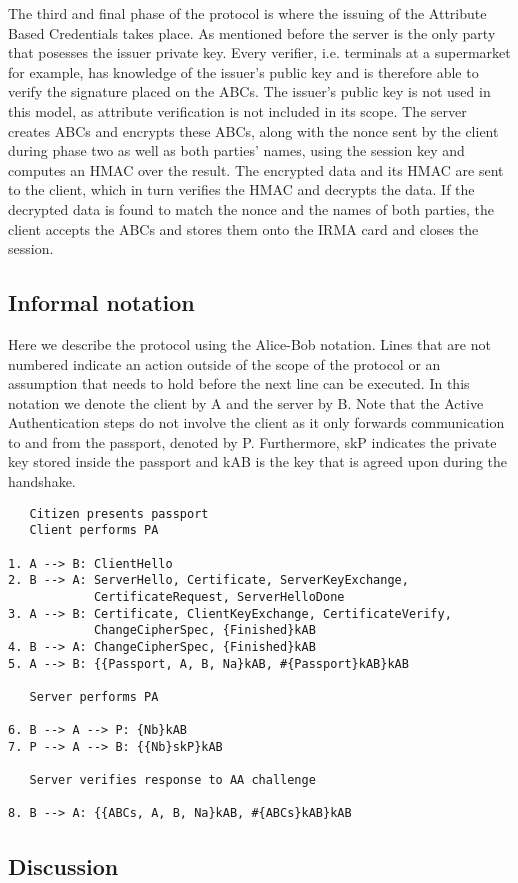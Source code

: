 The third and final phase of the protocol is where the issuing of the Attribute Based Credentials takes place. As mentioned before the server is the only party that posesses the issuer private key. Every verifier, i.e. terminals at a supermarket for example, has knowledge of the issuer's public key and is therefore able to verify the signature placed on the ABCs. The issuer's public key is not used in this model, as attribute verification is not included in its scope. The server creates ABCs and encrypts these ABCs, along with the nonce sent by the client during phase two as well as both parties' names, using the session key and computes an HMAC over the result. The encrypted data and its HMAC are sent to the client, which in turn verifies the HMAC and decrypts the data. If the decrypted data is found to match the nonce and the names of both parties, the client accepts the ABCs and stores them onto the IRMA card and closes the session.

\subsection{Informal notation}
Here we describe the protocol using the Alice-Bob notation. Lines that are not numbered indicate an action outside of the scope of the protocol or an assumption that needs to hold before the next line can be executed. In this notation we denote the client by A and the server by B. Note that the Active Authentication steps do not involve the client as it only forwards communication to and from the passport, denoted by P. Furthermore, skP indicates the private key stored inside the passport and kAB is the key that is agreed upon during the handshake.
\begin{verbatim}
   Citizen presents passport
   Client performs PA
  
1. A --> B: ClientHello
2. B --> A: ServerHello, Certificate, ServerKeyExchange, 
            CertificateRequest, ServerHelloDone
3. A --> B: Certificate, ClientKeyExchange, CertificateVerify, 
            ChangeCipherSpec, {Finished}kAB
4. B --> A: ChangeCipherSpec, {Finished}kAB
5. A --> B: {{Passport, A, B, Na}kAB, #{Passport}kAB}kAB

   Server performs PA
  
6. B --> A --> P: {Nb}kAB
7. P --> A --> B: {{Nb}skP}kAB

   Server verifies response to AA challenge
  
8. B --> A: {{ABCs, A, B, Na}kAB, #{ABCs}kAB}kAB

\end{verbatim}


\subsection{Discussion}
